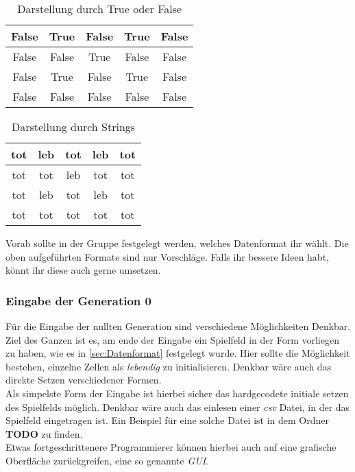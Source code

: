 \begin{table}[H]
	\center
	\begin{tabular}{|c|c|c|c|c|}
	\hline
	False  & True& False & True & False \\ \hline
	False  & False& True & False & False\\ \hline
	False  & True& False & True & False\\ \hline
	False  & False& False & False & False\\ \hline
	\end{tabular}
	\caption*{Darstellung durch True oder False}
\end{table}

\begin{table}[H]
	\center
	\begin{tabular}{|c|c|c|c|c|}
	\hline
	tot  & leb& tot & leb & tot \\ \hline
	tot  & tot& leb & tot & tot\\ \hline
	tot  & leb& tot & leb & tot\\ \hline
	tot  & tot& tot & tot & tot\\ \hline
	\end{tabular}	
	\caption*{Darstellung durch Strings}
\end{table}
Vorab sollte in der Gruppe festgelegt werden, welches Datenformat ihr wählt. Die oben aufgeführten Formate sind nur Vorschläge. Falls ihr bessere Ideen habt, könnt ihr diese auch gerne umsetzen.

\subsubsection{Eingabe der Generation 0}
Für die Eingabe der nullten Generation sind verschiedene Möglichkeiten Denkbar. Ziel des Ganzen ist es, am ende der Eingabe ein Spielfeld in der Form vorliegen zu haben, wie es in \ref{sec:Datenformat} festgelegt wurde. Hier sollte die Möglichkeit bestehen, einzelne Zellen als \textit{lebendig} zu initialisieren. Denkbar wäre auch das direkte Setzen verschiedener Formen. \\
Als simpelste Form der Eingabe ist hierbei sicher das hardgecodete initiale setzen des Spielfelds möglich. Denkbar wäre auch das einlesen einer \textit{csv} Datei, in der das Spielfeld eingetragen ist. Ein Beispiel für eine solche Datei ist in dem Ordner \textbf{TODO} zu finden. \\
Etwas fortgeschrittenere Programmierer können hierbei auch auf eine grafische Oberfläche zurückgreifen, eine so genannte \textit{GUI}. 

